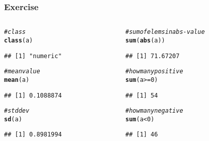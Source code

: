 \documentclass[12pt]{beamer}\usepackage[]{graphicx}\usepackage[]{color}
\makeatletter
\newcommand{\hlnum}[1]{\textcolor[rgb]{0.686,0.059,0.569}{#1}}%
\newcommand{\hlcom}[1]{\textcolor[rgb]{0.678,0.584,0.686}{\textit{#1}}}%
\newcommand{\hlopt}[1]{\textcolor[rgb]{0,0,0}{#1}}%
\newcommand{\hlstd}[1]{\textcolor[rgb]{0.345,0.345,0.345}{#1}}%
\newcommand{\hlkwd}[1]{\textcolor[rgb]{0.737,0.353,0.396}{\textbf{#1}}}%
\newenvironment{kframe}{%
 \def\at@end@of@kframe{}%
 \ifinner\ifhmode%
  \def\at@end@of@kframe{\end{minipage}}%
  \begin{minipage}{\columnwidth}%
 \fi\fi%
 \def\FrameCommand##1{\hskip\@totalleftmargin \hskip-\fboxsep
 \colorbox{shadecolor}{##1}\hskip-\fboxsep
     \hskip-\linewidth \hskip-\@totalleftmargin \hskip\columnwidth}%
 \MakeFramed {\advance\hsize-\width
   \@totalleftmargin\z@ \linewidth\hsize
   \@setminipage}}%
 {\par\unskip\endMakeFramed%
 \at@end@of@kframe}
\newenvironment{knitrout}{}{} %
\makeatother
\begin{document}
\begin{frame}[fragile]
\frametitle{Exercise}

\begin{columns}[t]
\begin{column}{0.45\textwidth}
\begin{knitrout}\footnotesize
{}\color{fgcolor}\begin{kframe}
\begin{alltt}
\hlcom{# class}
\hlkwd{class}\hlstd{(a)}
\end{alltt}
\begin{verbatim}
## [1] "numeric"
\end{verbatim}
\begin{alltt}
\hlcom{# mean value}
\hlkwd{mean}\hlstd{(a)}
\end{alltt}
\begin{verbatim}
## [1] 0.1088874
\end{verbatim}
\begin{alltt}
\hlcom{# std dev}
\hlkwd{sd}\hlstd{(a)}
\end{alltt}
\begin{verbatim}
## [1] 0.8981994
\end{verbatim}
\end{kframe}
\end{knitrout}
\end{column}

\begin{column}{0.45\textwidth}
\begin{knitrout}\footnotesize
{}\color{fgcolor}\begin{kframe}
\begin{alltt}
\hlcom{# sum of elems in abs-value}
\hlkwd{sum}\hlstd{(}\hlkwd{abs}\hlstd{(a))}
\end{alltt}
\begin{verbatim}
## [1] 71.67207
\end{verbatim}
\begin{alltt}
\hlcom{# how many positive}
\hlkwd{sum}\hlstd{(a} \hlopt{>=} \hlnum{0}\hlstd{)}
\end{alltt}
\begin{verbatim}
## [1] 54
\end{verbatim}
\begin{alltt}
\hlcom{# how many negative}
\hlkwd{sum}\hlstd{(a} \hlopt{<} \hlnum{0}\hlstd{)}
\end{alltt}
\begin{verbatim}
## [1] 46
\end{verbatim}
\end{kframe}
\end{knitrout}
\end{column}
\end{columns}

\end{frame}
\end{document}
